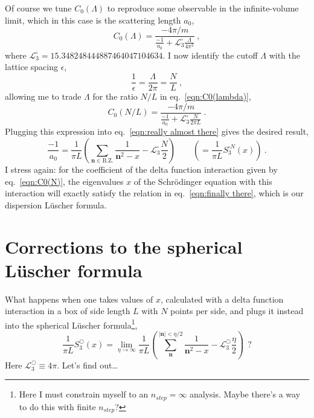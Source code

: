 \documentclass[11pt]{article}
\begin{document}
Of course we tune $C_0(\Lambda)$ to reproduce some observable in the infinite-volume limit, which in this case is the scattering length $a_0$,
\begin{equation}\label{eqn:C0(lambda)}
C_0(\Lambda)=\frac{-4\pi/m}{\frac{-1}{a_0}+\mathcal{L}^\square_3\frac{\Lambda}{4\pi^2}}\ ,
\end{equation}
where $\mathcal{L}^\square_3=15.348248444887464047104634$. I now identify the cutoff $\Lambda$ with the lattice spacing $\epsilon$,
\begin{equation}
\frac{1}{\epsilon}=\frac{\Lambda}{2\pi}=\frac{N}{L}\ ,
\end{equation}
allowing me to trade $\Lambda$ for the ratio $N/L$ in eq.~\eqref{eqn:C0(lambda)},
\begin{equation}\label{eqn:C0(N)}
C_0(N/L)=\frac{-4\pi/m}{\frac{-1}{a_0}+\mathcal{L}^\square_3\frac{N}{2\pi L}}\ .
\end{equation}
Plugging this expression into eq.~\eqref{eqn:really almost there} gives the desired result,
\begin{equation}\label{eqn:finally there}
\frac{-1}{a_0}=\frac{1}{\pi L}\left(\sum_{\bm n\in\mathrm{B.Z.}}\frac{1}{\bm n^2-x}-\mathcal{L}^\square_3\frac{N}{2}\right)\quad\quad\left(=\frac{1}{\pi L}S^{\square N}_3(x)\right)\ .
\end{equation}
I stress again:  for the coefficient of the delta function interaction given by eq.~\eqref{eqn:C0(N)}, the eigenvalues $x$ of the Schr\"odinger equation with this interaction will exactly satisfy the relation in eq.~\eqref{eqn:finally there}, which is our dispersion L\"uscher formula.  

\section{Corrections to the spherical L\"uscher formula}
What happens when one takes values of $x$, calculated with a delta function interaction in a box of side length $L$ with $N$ points per side, and plugs it instead into the spherical L\"uscher formula\footnote{Here I must constrain myself to an $n_{step}=\infty$ analysis.  Maybe there's a way to do this with finite $n_{step}$?},
\begin{equation}\label{eqn:spherical luscher}
\frac{1}{\pi L}S^\bigcirc_3(x)=\lim_{\eta \to\infty}\frac{1}{\pi L}\left(\sum_{\bm n}^{|\bm n|<\eta / 2} \frac{1}{\bm n^{2}-x}-\mathcal{L}^\bigcirc_3\frac{\eta}{2}\right)\ \ ?
\end{equation}
Here $\mathcal{L}^{\bigcirc}_3\equiv 4\pi$.  Let's find out\ldots
\end{document}
